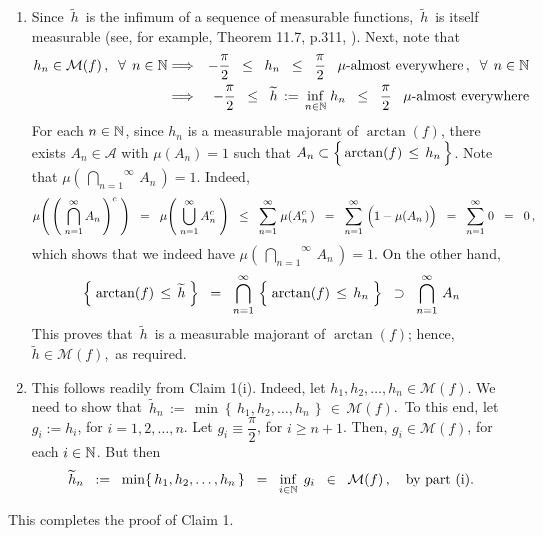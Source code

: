 \begin{enumerate}
\item
	Since \,$\widetilde{h}$\, is the infimum of a sequence of measurable functions,
	\,$\widetilde{h}$\, is itself measurable (see, for example, Theorem 11.7, p.311, \cite{Rudin1976}).
	Next, note that
	\begin{eqnarray*}
	h_{n} \in \mathcal{M}(f)\,,\;\; \forall\;\, n \in \mathbb{N}
	&\Longrightarrow&
		-\dfrac{\pi}{2} \;\;\leq\;\; h_{n} \;\;\leq\;\; \dfrac{\pi}{2} \;\;\; \mu\textnormal{-almost everywhere}\,,\;\;
		\forall\;\, n \in \mathbb{N}
	\\
	&\Longrightarrow&
		-\dfrac{\pi}{2} \;\;\leq\;\; \widetilde{h} \,:=\, \underset{n\in\mathbb{N}}{\inf}\;h_{n} \;\;\leq\;\; \dfrac{\pi}{2}
		\;\;\; \mu\textnormal{-almost everywhere}
	\end{eqnarray*}
	For each $n \in \mathbb{N}$, since $h_{n}$ is a measurable majorant of $\arctan(f)$,
	there exists $A_{n} \in \mathcal{A}$ with $\mu(A_{n}) = 1$
	such that $A_{n} \subset \left\{\, \arctan(f) \,\overset{{\color{white}.}}{\leq}\, h_{n} \,\right\}$.
	Note that $\mu\!\left(\,\overset{\infty}{\underset{n=1}{\bigcap}}\,A_{n}\,\right) = 1$.
	Indeed,
	\begin{equation*}
	\mu\!\left(\,\left(\;\overset{\infty}{\underset{n=1}{\bigcap}}\,A_{n}\,\right)^{c}\;\right)
	\;\; = \;\;
		\mu\!\left(\;\overset{\infty}{\underset{n=1}{\bigcup}}\,A_{n}^{c}\;\right)
	\;\; \leq \;\;
		\overset{\infty}{\underset{n=1}{\sum}}\;\mu\!\left(A_{n}^{c}\,\right)
	\;\; = \;\;
		\overset{\infty}{\underset{n=1}{\sum}}\,\left(1 \overset{{\color{white}.}}{-} \mu\!\left(A_{n}\,\right)\right)
	\;\; = \;\;
		\overset{\infty}{\underset{n=1}{\sum}}\;0
	\;\; = \;\;
		0\,,
	\end{equation*}
	which shows that we indeed have $\mu\!\left(\,\overset{\infty}{\underset{n=1}{\bigcap}}\,A_{n}\,\right) = 1$.
	On the other hand,
	\begin{equation*}
	\left\{\;\arctan(f) \,\leq\, \widetilde{h}\;\right\}
	\;\; = \;\;
		\bigcap_{n=1}^{\infty}\,\left\{\;\arctan(f) \,\overset{{\color{white}.}}{\leq}\, h_{n}\;\right\}
	\;\; \supset \;\;
		\bigcap_{n=1}^{\infty}\,A_{n}
	\end{equation*}
	This proves that \,$\widetilde{h}$\, is a measurable majorant of $\arctan(f)$;
	hence, \,$\widetilde{h} \in \mathcal{M}(f)$,\, as required.
\item
	This follows readily from Claim 1(i).
	Indeed, let $h_{1}, h_{2}, \ldots, h_{n} \in \mathcal{M}(f)$.
	We need to show that
	\,$\widetilde{h}_{n} \,:=\, \min\!\left\{\,h_{1},h_{2},\ldots,h_{n}\,\right\} \,\in\, \mathcal{M}(f)$.\,
	To this end, let $g_{i} := h_{i}$, for $i = 1,2,\ldots,n$. Let $g_{i} \equiv \dfrac{\pi}{2}$, for $i \geq n+1$.
	Then, $g_{i} \in \mathcal{M}(f)$, for each $i \in \mathbb{N}$.
	But then
	\begin{equation*}
	\widetilde{h}_{n}
	\;\; := \;\;
		\min\!\left\{\,h_{1},h_{2},\ldots,h_{n}\,\right\}
	\;\; = \;\;
		\underset{i\in\mathbb{N}}{\inf}\;\, g_{i}
	\;\; \in \;\;
		\mathcal{M}(f)\,,
		\quad
		\textnormal{by part (i)}.
	\end{equation*}
\end{enumerate}
This completes the proof of Claim 1.

